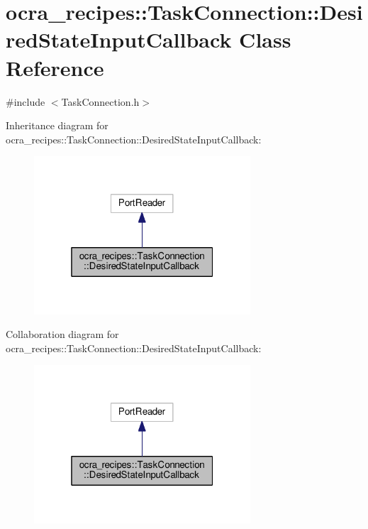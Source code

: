 \hypertarget{classocra__recipes_1_1TaskConnection_1_1DesiredStateInputCallback}{}\section{ocra\+\_\+recipes\+:\+:Task\+Connection\+:\+:Desired\+State\+Input\+Callback Class Reference}
\label{classocra__recipes_1_1TaskConnection_1_1DesiredStateInputCallback}


{\ttfamily \#include $<$Task\+Connection.\+h$>$}



Inheritance diagram for ocra\+\_\+recipes\+:\+:Task\+Connection\+:\+:Desired\+State\+Input\+Callback\+:
\nopagebreak
\begin{figure}[H]
\begin{center}
\leavevmode
\includegraphics[width=229pt]{d8/daa/classocra__recipes_1_1TaskConnection_1_1DesiredStateInputCallback__inherit__graph}
\end{center}
\end{figure}


Collaboration diagram for ocra\+\_\+recipes\+:\+:Task\+Connection\+:\+:Desired\+State\+Input\+Callback\+:
\nopagebreak
\begin{figure}[H]
\begin{center}
\leavevmode
\includegraphics[width=229pt]{d2/da7/classocra__recipes_1_1TaskConnection_1_1DesiredStateInputCallback__coll__graph}
\end{center}
\end{figure}
